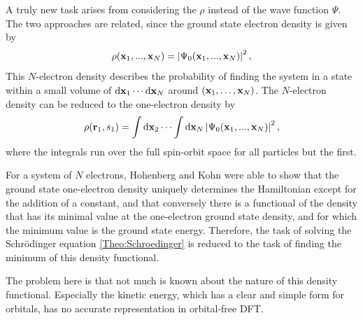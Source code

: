 \documentclass[8.5pt,twoside,twocolumn]{article}
\newcommand\di{\te{d}}
\renewcommand\r{\bo r}
\theoremstyle{standard}
\begin{document}
A truly new task arises from considering the  $\rho$ instead of the wave function
$\Psi$. The two approaches are related, since the ground state electron density is given by
\begin{equation}
 \rho(\mathbf{x}_1,...,\mathbf{x}_N)=\left|{\Psi_0(\mathbf{x}_1,...,\mathbf{x}_N)}\right|^2,
 \label{Theo:NElectronDensity}
\end{equation}
This $N$-electron density describes the probability of finding the system in a state within 
a small volume of $\di \x_1 \cdots \di \x_N$ around $(\mathbf{x}_1,\ldots,\mathbf{x}_N)$. 
The $N$-electron density can be reduced to the one-electron density by
\begin{equation}
 \rho(\r_1,s_1)=\int\di\x_2 \cdots \int\di \x_N \abs{\Psi_0(\x_1,...,\x_N)}^2,
 \label{Theo:1ElectronDensity}
\end{equation}
where the integrals run over %
the full spin-orbit space for all particles but the first.

For a system of $N$ electrons, Hohenberg and Kohn \cite{HohenbergKohn1964} were able to show that the ground state
one-electron density uniquely determines the Hamiltonian except for the addition of a constant,
and that conversely there is a functional of the density that has its minimal value at the one-electron
ground state density, and for which the minimum value is the ground state energy. Therefore, the task
of solving the Schrödinger equation \eqref{Theo:Schroedinger} is reduced to the task of finding
the minimum of this density functional.

The problem here is that not much is known about the nature of this density
functional. Especially the kinetic energy, which has a clear and simple form
for orbitals, has no accurate representation in orbital-free DFT.
\end{document}
